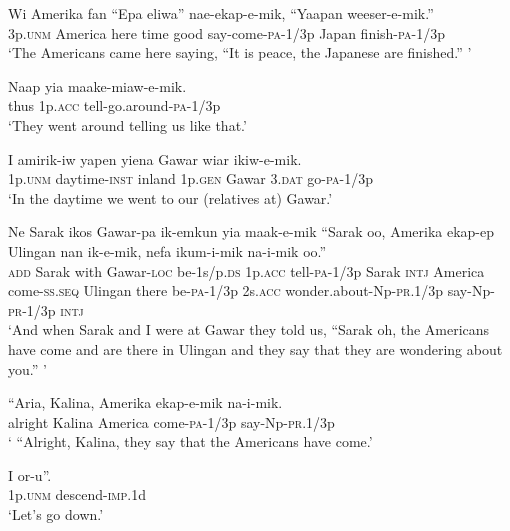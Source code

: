 \ea\label{ex:a:x98}
\gll  Wi  Amerika  fan  “Epa  eliwa”  nae-ekap-e-mik,  “Yaapan  weeser-e-mik.” \\
3p.\textsc{unm}  America  here  time  good  say-come-\textsc{pa}-1/3p    Japan  finish-\textsc{pa}-1/3p \\


\glt ‘The Americans came here saying, “It is peace, the Japanese are finished.” ’ \\
\z


\ea\label{ex:a:x99}
\gll  Naap  yia  maake-miaw-e-mik. \\
thus  1p.\textsc{acc}  tell-go.around-\textsc{pa}-1/3p \\
\glt ‘They went around telling us like that.’ \\
\z


\ea\label{ex:a:x100}
\gll  I  amirik-iw  yapen  yiena  Gawar  wiar       ikiw-e-mik. \\
1p.\textsc{unm}  daytime-\textsc{inst}  inland  1p.\textsc{gen}  Gawar  3.\textsc{dat}  go-\textsc{pa}-1/3p \\


\glt ‘In the daytime we went to our (relatives at) Gawar.’ \\
\z


\ea\label{ex:a:x101}
\gll  Ne  Sarak  ikos  Gawar-pa  ik-emkun  yia  maak-e-mik     “Sarak  oo,  Amerika  ekap-ep  Ulingan  nan  ik-e-mik,           nefa  ikum-i-mik  na-i-mik  oo.” \\
\textsc{add}  Sarak  with  Gawar-\textsc{loc}  be-1s/p.\textsc{ds}  1p.\textsc{acc}  tell-\textsc{pa}-1/3p  Sarak  \textsc{intj}  America  come-\textsc{ss.seq}  Ulingan  there  be-\textsc{pa}-1/3p    2s.\textsc{acc}  wonder.about-Np-\textsc{pr}.1/3p  say-Np-\textsc{pr}-1/3p  \textsc{intj} \\




\glt ‘And when Sarak and I were at Gawar they told us, “Sarak oh, the Americans have come and are there in Ulingan and they say that they are wondering about you.” ’ \\
\z


\ea\label{ex:a:x102}
\gll  “Aria,  Kalina,  Amerika  ekap-e-mik  na-i-mik. \\
alright  Kalina  America  come-\textsc{pa}-1/3p  say-Np-\textsc{pr}.1/3p \\
\glt ‘ “Alright, Kalina, they say that the Americans have come.’ \\
\z


\ea\label{ex:a:x103}
\gll  I  or-u”. \\
1p.\textsc{unm}  descend-\textsc{imp}.1d \\
\glt ‘Let’s go down.’ \\
\z


